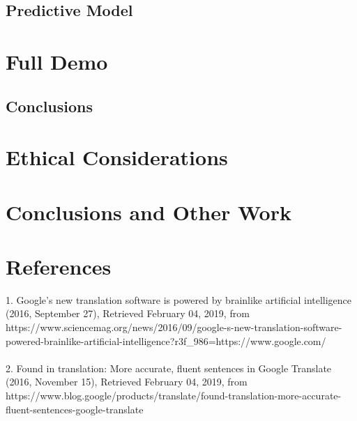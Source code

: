 \documentclass{llncs}
\begin{document}
\subsection{Predictive Model}

\section{Full Demo}

\subsection{Conclusions}

\section{Ethical Considerations}

\section{Conclusions and Other Work}

\section{References}
1.	Google’s new translation software is powered by brainlike artificial intelligence (2016, September 27),  Retrieved February 04, 2019, from 
https://www.sciencemag.org/news/2016/09/google-s-new-translation-software-powered-brainlike-artificial-intelligence?r3f\_986=https://www.google.com/
\\
\\
2.	Found in translation: More accurate, fluent sentences in Google Translate (2016, November 15),  Retrieved February 04, 2019, from https://www.blog.google/products/translate/found-translation-more-accurate-fluent-sentences-google-translate
\end{document}
